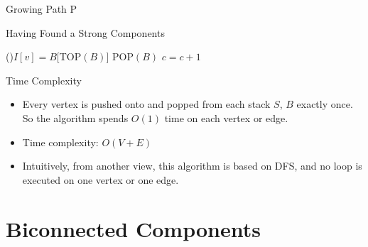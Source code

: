 \documentclass{beamer}
\begin{document}
\begin{frame}{Growing Path P}
	\SetAlFnt{\small}
	\begin{algorithm}[H]
		\caption{A Part of High-Level Algorithm}
	\end{algorithm}
	\begin{procedure}[H]
		\caption{A Part of DFS(v)}
	\end{procedure}
\end{frame}

\begin{frame}{Having Found a Strong Components}
	\SetAlFnt{\small}
	\begin{algorithm}[H]
		\caption{A Part of High-Level Algorithm}
	\end{algorithm}
	\begin{procedure}[H]
		\caption{A Part of DFS(v)}
		\If(){$I[v]=B[$TOP$(B)]$} {
			POP$(B)$\;
			$c = c + 1$\;
		}
	\end{procedure}
\end{frame}

\begin{frame}{Time Complexity}
	\begin{itemize}
		\item
		Every vertex is pushed onto and popped from each stack $S$, $B$ exactly once.
		So the algorithm spends $O(1)$ time on each vertex or edge.
		\item
		Time complexity: $O(V+E)$
		\item
		Intuitively, from another view, this algorithm is based on DFS, and no loop
		is executed on one vertex or one edge.
	\end{itemize}
\end{frame}



\section{Biconnected Components}
\end{document}
